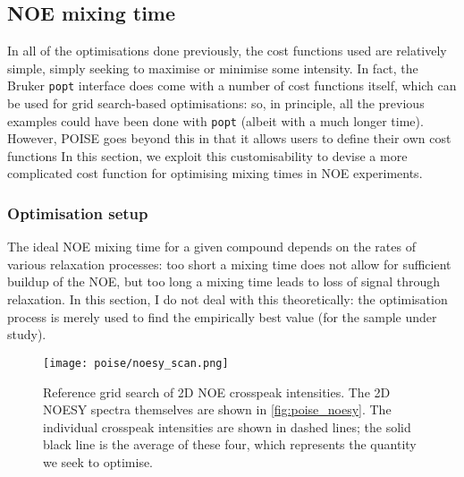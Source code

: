 \subsection{NOE mixing time}
\label{subsec:poise__noe}

In all of the optimisations done previously, the cost functions used are relatively simple, simply seeking to maximise or minimise some intensity.
In fact, the Bruker \texttt{popt} interface does come with a number of cost functions itself, which can be used for grid search-based optimisations: so, in principle, all the previous examples could have been done with \texttt{popt} (albeit with a much longer time).
However, POISE goes beyond this in that it allows users to define their own cost functions
In this section, we exploit this customisability to devise a more complicated cost function for optimising mixing times in NOE experiments.

\subsubsection{Optimisation setup}

The ideal NOE mixing time for a given compound depends on the rates of various relaxation processes: too short a mixing time does not allow for sufficient buildup of the NOE, but too long a mixing time leads to loss of signal through relaxation.
In this section, I do not deal with this theoretically: the optimisation process is merely used to find the empirically best value (for the sample under study).

\begin{figure}[!ht]
    \centering
    \texttt{[image: poise/noesy\_scan.png]}%
    \caption[Reference grid search of 2D NOE crosspeak intensities]{
        Reference grid search of 2D NOE crosspeak intensities.
        The 2D NOESY spectra themselves are shown in \cref{fig:poise_noesy}.
        The individual crosspeak intensities are shown in dashed lines; the solid black line is the average of these four, which represents the quantity we seek to optimise.
    }
    \label{fig:poise_noesy_scan}
\end{figure}

